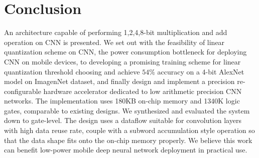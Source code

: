 \chapter{Conclusion}
\label{ch:conclusion}
An architecture capable of performing 1,2,4,8-bit multiplication and add operation on CNN is presented. We set out with the feasibility of linear quantization scheme on CNN, the power consumption bottleneck for deploying CNN on mobile devices, to developing a promising training scheme for linear quantization threshold choosing and achieve $54\%$ accuracy on a 4-bit AlexNet model on ImagenNet dataset, and finally design and implement a precision re-configurable hardware accelerator dedicated to low arithmetic precision CNN networks. The implementation uses 180KB on-chip memory and 1340K logic gates, comparable to existing designs. We synthesized and evaluated the system down to gate-level. The design uses a dataflow suitable for convolution layers with high data reuse rate, couple with a subword accumulation style operation so that the data shape fits onto the on-chip memory properly. We believe this work can benefit low-power mobile deep neural network deployment in practical use.
\iffalse
\textcolor{purple}{Summarise (one or two sentences each) where you set out and what path you went. From that, you should proceed to making clear what kind of advances your results enable. These can be both on the technical (chip design) or on the application level.}
\fi